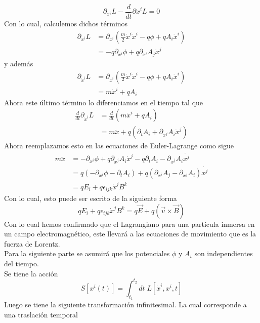 \documentclass[../main.tex]{subfiles}
\begin{document}
\begin{equation}
  \partial_{x^i} L  - \frac{d}{dt}\partial{\dot{x}^i}L = 0
\end{equation}
Con lo cual, calculemos dichos términos
\begin{align*}
  \partial_{x^i} L & = \partial_{x^i} \left( \frac{m}{2}\dot{x}^i\dot{x}^i - q\phi + qA_i\dot{x}^i  \right) \\
  & = -q\partial_{x^i}\phi + q\partial_{x^i}A_j\dot{x}^j
\end{align*}
y además
\begin{align*}
  \partial_{\dot{x}^i}L & = \partial_{\dot{x}^i} \left( \frac{m}{2}\dot{x}^i\dot{x}^i - q\phi + qA_i\dot{x}^i \right) \\
  & = m\dot{x}^i + qA_i
\end{align*}
Ahora este último término lo diferenciamos en el tiempo tal que 
\begin{align*}
  \frac{d}{dt}\partial_{\dot{x}^i} L & = \frac{d}{dt}\left( m\dot{x}^i + qA_i \right) \\
  & = m\ddot{x} + q\left( \partial_{t}A_i + \partial_{x^j}A_i\dot{x}^j  \right)
\end{align*}
Ahora reemplazamos esto en las ecuaciones de Euler-Lagrange como sigue
\begin{align*}
  m\ddot{x} & = -\partial_{x^i}\phi + q\partial_{x^j}A_i\dot{x}^j - q\partial_{t}A_i - \partial_{x^j}A_i\dot{x^j} \\
  & = q\left( -\partial_{x^i}\phi - \partial_{t}A_i \right) + q\left( \partial_{x^i}A_j - \partial_{x^j}A_i \right)\dot{x^j} \\
  & = qE_i + q\epsilon_{ijk}\dot{x}^jB^k
\end{align*}
Con lo cual, esto puede ser escrito de la siguiente forma
\begin{equation}
  qE_i + q\epsilon_{ijk}\dot{x}^jB^k = q\vec{E} + q(\vec{v}\times\vec{B})
\end{equation}
Con lo cual hemos confirmado que el Lagrangiano para una partícula inmersa en un campo electromagnético, este llevará a las ecuaciones de movimiento que es la fuerza de Lorentz.\\
Para la siguiente parte se asumirá que los potenciales $\phi$ y $A_i$ son independientes del tiempo. \\
Se tiene la acción
\begin{equation}
  S[x^i(t)] = \int_{t_1}^{t_2} dt \; L[\dot{x}^i,x^i,t]
\end{equation}
Luego se tiene la siguiente transformación infinitesimal. La cual corresponde a una traslación temporal
\end{document}
